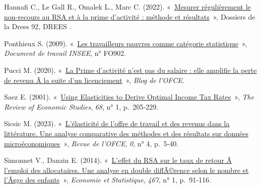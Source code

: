 \documentclass[
  french,
]{article}
\newlength{\cslhangindent}
\newenvironment{CSLReferences}[2] %
 {\begin{list}{}{%
  \setlength{\itemindent}{0pt}
  \setlength{\leftmargin}{0pt}
  \setlength{\parsep}{0pt}
  \ifodd #1
   \setlength{\leftmargin}{\cslhangindent}
   \setlength{\itemindent}{-1\cslhangindent}
  \fi
  \setlength{\itemsep}{#2\baselineskip}}}
 {\end{list}}
\renewenvironment{CSLReferences}[2] %
    {\begin{list}{}{%
          \setlength{\itemindent}{0pt}
          \setlength{\leftmargin}{0pt}
          \setlength{\parsep}{0pt}
          \ifodd #1
          \setlength{\leftmargin}{\cslhangindent}
          \setlength{\itemindent}{-1\cslhangindent}
          \fi
          \setlength{\itemsep}{0.25\baselineskip}}} %
    {\end{list}}
\begin{document}
\begin{CSLReferences}{0}{1}
Hannafi C., Le Gall R., Omalek L., Marc C. (2022).
{«~\href{https://hal.science/hal-03618416}{{Mesurer régulièrement le
non-recours au RSA et à la prime d'activité : méthode et résultats}}~»},
Dossiers de la Drees 92, {DREES }.

Ponthieux S. (2009).
{«~\href{https://www.insee.fr/fr/statistiques/1380802}{Les travailleurs
pauvres comme catégorie statistique}~»}, \emph{Document de travail
INSEE}, n° FO902.

Pucci M. (2020).
{«~\href{https://www.ofce.sciences-po.fr/blog/la-prime-dactivite-nest-pas-du-salaire-elle-amplifie-la-perte-de-revenu-a-la-suite-dun-licenciement/}{La
Prime d'activité n'est pas du salaire : elle amplifie la perte de revenu
Ã la suite d'un licenciement}~»}, \emph{Blog de l'OFCE}.

Saez E. (2001). {«~\href{https://doi.org/None}{Using Elasticities to
Derive Optimal Income Tax Rates}~»}, \emph{The Review of Economic
Studies}, \emph{68}, n° 1, p.~205‑229.

Sicsic M. (2023). {«~\href{https://doi.org/None}{L'élasticité de l'offre
de travail et des revenus dans la littérature. Une analyse comparative
des méthodes et des résultats sur données microéconomiques}~»},
\emph{Revue de l'OFCE}, \emph{0}, n° 4, p.~5‑40.

Simonnet V., Danzin E. (2014).
{«~\href{https://doi.org/10.3406/estat.2014.10248}{L'effet du RSA sur le
taux de retour Ã l'emploi des allocataires. Une analyse en double
diffÃ©rence selon le nombre et l'Ã¢ge des enfants}~»}, \emph{Economie et
Statistique}, \emph{467}, n° 1, p.~91‑116.

\end{CSLReferences}
\end{document}
